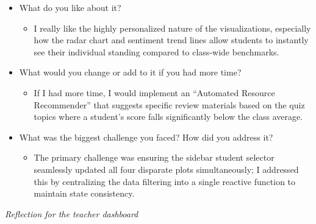 \documentclass[
]{article}
\providecommand{\tightlist}{%
  \setlength{\itemsep}{0pt}\setlength{\parskip}{0pt}}
\begin{document}
\begin{itemize}
\tightlist
\item
  What do you like about it?

  \begin{itemize}
  \tightlist
  \item
    I really like the highly personalized nature of the visualizations,
    especially how the radar chart and sentiment trend lines allow
    students to instantly see their individual standing compared to
    class-wide benchmarks.
  \end{itemize}
\item
  What would you change or add to it if you had more time?

  \begin{itemize}
  \tightlist
  \item
    If I had more time, I would implement an ``Automated Resource
    Recommender'' that suggests specific review materials based on the
    quiz topics where a student's score falls significantly below the
    class average.
  \end{itemize}
\item
  What was the biggest challenge you faced? How did you address it?

  \begin{itemize}
  \tightlist
  \item
    The primary challenge was ensuring the sidebar student selector
    seamlessly updated all four disparate plots simultaneously; I
    addressed this by centralizing the data filtering into a single
    reactive function to maintain state consistency.
  \end{itemize}
\end{itemize}

\emph{Reflection for the teacher dashboard}
\end{document}
